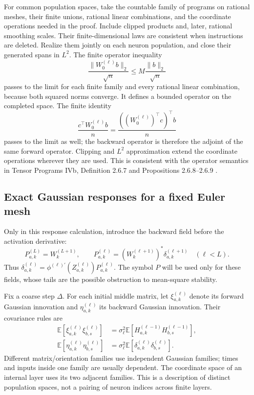 For common population spaces, take the countable family of programs on
rational meshes, their finite unions, rational linear combinations, and
the coordinate operations needed in the proof.  Include clipped products
and, later, rational smoothing scales.  Their finite-dimensional laws
are consistent when instructions are deleted.  Realize them jointly on
each neuron population, and close their generated spans in $L^2$.
The finite operator inequality
\[
 \frac{\|W_0^{(\ell)}b\|_2}{\sqrt n}
 \le M\frac{\|b\|_2}{\sqrt n}
\]
passes to the limit for each finite family and every rational linear
combination, because both squared norms converge.  It defines a bounded
operator on the completed space.  The finite identity
\[
 \frac{c^\top W_0^{(\ell)}b}{n}
 =\frac{((W_0^{(\ell)})^\top c)^\top b}{n}
\]
passes to the limit as well; the backward operator is therefore the
adjoint of the same forward operator.  Clipping and $L^2$ approximation
extend the coordinate operations wherever they are used.  This is
consistent with the operator semantics in Tensor Programs IVb,
Definition 2.6.7 and Propositions 2.6.8--2.6.9 \cite{TP4b}.

\subsection{Exact Gaussian responses for a fixed Euler mesh}
\label{app:response-formulas}

Only in this response calculation, introduce the backward field before
the activation derivative:
\[
 P_{a,k}^{(L)}=W_k^{(L+1)},\qquad
 P_{a,k}^{(\ell)}=(W_k^{(\ell+1)})^*
                         \delta_{a,k}^{(\ell+1)}\quad(\ell<L).
\]
Thus $\delta_{a,k}^{(\ell)}=
\phi^{(\ell)\prime}(Z_{a,k}^{(\ell)})P_{a,k}^{(\ell)}$.
The symbol $P$ will be used only for these fields, whose tails are the
possible obstruction to mean-square stability.

Fix a coarse step $\Delta$.  For each initial middle matrix, let
$\xi_{a,k}^{(\ell)}$ denote its forward Gaussian innovation and
$\eta_{a,k}^{(\ell)}$ its backward Gaussian innovation.  Their covariance
rules are
\begin{align*}
 \mathbb E[\xi_{a,k}^{(\ell)}\xi_{b,s}^{(\ell)}]
 &=\sigma_\ell^2
       \mathbb E[H_{a,k}^{(\ell-1)}H_{b,s}^{(\ell-1)}],\\
 \mathbb E[\eta_{a,k}^{(\ell)}\eta_{b,s}^{(\ell)}]
 &=\sigma_\ell^2
       \mathbb E[\delta_{a,k}^{(\ell)}\delta_{b,s}^{(\ell)}].
\end{align*}
Different matrix/orientation families use independent Gaussian families;
times and inputs inside one family are usually dependent.  The coordinate
space of an internal layer uses its two adjacent families.  This is a
description of distinct population spaces, not a pairing of neuron
indices across finite layers.

